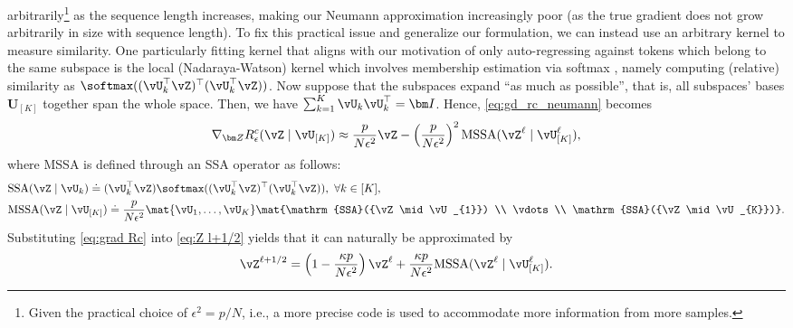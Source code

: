 \documentclass[../../book-main.tex]{subfiles}
\begin{document}
arbitrarily\footnote{Given the practical choice of
    \(\epsilon^{2} = p/N\), i.e., a more precise code is used to
accommodate more information from more samples.} as the sequence
length increases, making our Neumann approximation
increasingly poor (as the true gradient does not grow arbitrarily in
size with sequence length). To fix this practical issue and
generalize our formulation, we can instead use an arbitrary kernel to
measure similarity. One particularly fitting
kernel that aligns with our motivation of only auto-regressing
against tokens which belong to the same subspace is the local
(Nadaraya-Watson) kernel which involves membership estimation via
softmax \citep{chaudhari2021attentive}, namely computing (relative)
similarity as $\softmax((\vU_{k}^\top\vZ)^\top(\vU_{k}^\top\vZ))$.
Now suppose that the subspaces expand ``as much as possible'', that
is, all subspaces' bases $\bm U_{[K]}$ together span the whole space.
Then, we have $\sum_{k = 1}^{K} \vU_{k}\vU_{k}^\top = \bm I$. Hence,
\eqref{eq:gd_rc_neumann} becomes
\begin{align}\label{eq:grad Rc}
    \nabla_{\bm Z} R_{\epsilon}^{c}(\vZ \mid \vU_{[K]})
    \approx  \frac{p}{N\epsilon^2} \vZ -  \left(
    \frac{p}{N\epsilon^2}\right)^2 \operatorname{MSSA}(\vZ^{\ell} \mid
    \vU_{[K]}^{\ell}),
\end{align}
where MSSA is defined through an SSA operator as follows:
\begin{align}
    & \mathrm{SSA}(\vZ \mid \vU_{k})
    \doteq (\vU_{k}^\top
    \vZ)\softmax((\vU_{k}^\top\vZ)^\top(\vU_{k}^\top\vZ)),
    \ \forall k \in [K], \label{eq:SSA} \\
    & \mathrm{MSSA}(\vZ \mid \vU_{[K]})
    \doteq \frac{p}{N\epsilon^2} \mat{\vU_{1}, \dots,
    \vU_{K}}\mat{\mathrm{SSA}({\vZ \mid \vU_{1}}) \\ \vdots
    \\ \mathrm{SSA}({\vZ \mid \vU_{K}})}.\label{eq:Multi-Head-SSA}
\end{align}
Substituting \eqref{eq:grad Rc} into \eqref{eq:Z l+1/2} yields that
it can naturally be approximated by
\begin{equation}
    \vZ^{\ell + 1/2} = \left(1 - \frac{\kappa p}{N\epsilon^2}\right)
    \vZ^{\ell} + \frac{\kappa p}{N\epsilon^2}
    \mathrm{MSSA}(\vZ^{\ell} \mid \vU_{[K]}^{\ell}).
    \label{eq:gd-mcr-parts}
\end{equation}
\end{document}
